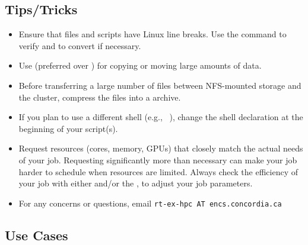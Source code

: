 \subsection{Tips/Tricks}
\label{sect:tips}

\begin{itemize}
	\item
	Ensure that files and scripts have Linux line breaks.
	Use the  command to verify and  to convert if necessary.

	\item
	Use  (preferred over ) for copying or moving large amounts of data.

	\item
	Before transferring a large number of files between NFS-mounted storage and
	the cluster, compress the files into a  archive.

	\item
	If you plan to use a different shell (e.g., ~\cite{aosa-book-vol1-bash}),
	change the shell declaration at the beginning of your script(s).

	\item
	Request resources (cores, memory, GPUs) that closely match the actual needs of your job.
	Requesting significantly more than necessary can make your job harder to schedule when
	resources are limited. Always check the efficiency of your job with either 
	and/or the , to adjust your job parameters.

	\item
	For any concerns or questions, email \texttt{rt-ex-hpc AT encs.concordia.ca}
\end{itemize}

\subsection{Use Cases}
\label{sect:cases}

